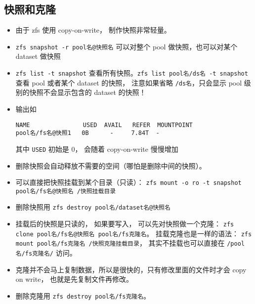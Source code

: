 \subsection{快照和克隆}
\begin{itemize}
\item 由于 zfs 使用 copy-on-write， 制作快照非常轻量。
\item \verb`zfs snapshot -r pool名@快照名` 可以对整个 pool 做快照，也可以对某个 dataset 做快照
\item \verb`zfs list -t snapshot` 查看所有快照。\verb`zfs list pool名/ds名 -t snapshot` 查看 pool 或者某个 dataset 的快照， 注意如果省略 \verb`/ds名`，只会显示 pool 级别的快照不会显示包含的 dataset 的快照！
\item 输出如
\begin{lstlisting}[language=none]
NAME               USED  AVAIL   REFER  MOUNTPOINT
pool名/fs名@快照1   0B      -     7.84T  -
\end{lstlisting}
其中 \verb`USED` 初始是 0， 会随着 copy-on-write 慢慢增加
\item 删除快照会自动释放不需要的空间（哪怕是删除中间的快照）。
\item 可以直接把快照挂载到某个目录（只读）： \verb`zfs mount -o ro -t snapshot pool名/fs名@快照名 /快照挂载目录`
\item 删除快照用 \verb`zfs destroy pool名/dataset名@快照名`
\item 挂载后的快照是只读的， 如果要写入， 可以先对快照做一个克隆： \verb`zfs clone pool名/fs名@快照名 pool名/fs克隆名`。 挂载克隆也是一样的语法： \verb`zfs mount pool名/fs克隆名 /快照克隆挂载目录`， 其实不挂载也可以直接在 \verb`/pool名/fs克隆名/` 访问。
\item 克隆并不会马上复制数据，所以是很快的，只有修改里面的文件时才会 copy on write， 也就是先复制文件再修改。
\item 删除克隆用 \verb`zfs destroy pool名/fs克隆名`。
\end{itemize}

